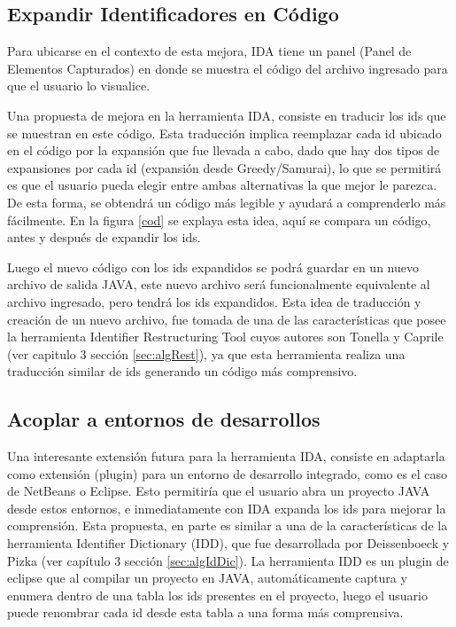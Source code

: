 \subsection{Expandir Identificadores en Código}

Para ubicarse en el contexto de esta mejora, IDA tiene un panel (Panel de Elementos Capturados) en donde se muestra el código del archivo ingresado para que el usuario lo visualice. 


Una propuesta de mejora en la herramienta IDA, consiste en traducir los ids que se muestran en este código.
Esta traducción implica reemplazar cada id ubicado en el código por la expansión que fue llevada a cabo, dado que hay dos tipos de expansiones por cada id (expansión desde Greedy/Samurai), lo que se permitirá es que el usuario pueda elegir entre ambas alternativas la que mejor le parezca. De esta forma, se obtendrá un código más legible y ayudará a comprenderlo más fácilmente. En la figura \ref{cod} se explaya esta idea, aquí se compara un código, antes y después de expandir los ids.

Luego el nuevo código con los ids expandidos se podrá guardar en un nuevo archivo de salida JAVA, este nuevo archivo será funcionalmente equivalente al archivo ingresado, pero tendrá los ids expandidos. Esta idea de traducción y creación de un nuevo archivo, fue tomada de una de las características que posee la herramienta Identifier Restructuring Tool cuyos autores son Tonella y Caprile (ver capitulo 3 sección \ref{sec:algRest}), ya que esta herramienta realiza una traducción similar de ids generando un código más comprensivo.

\subsection{Acoplar a entornos de desarrollos}

Una interesante extensión futura para la herramienta IDA, consiste en adaptarla como extensión (plugin) para un entorno de desarrollo integrado, como es el caso de NetBeans o Eclipse. Esto permitiría que el usuario abra un proyecto JAVA desde estos entornos, e inmediatamente con IDA expanda los ids para mejorar la comprensión. Esta propuesta, en parte es similar a una de la características de la herramienta Identifier Dictionary (IDD), que fue desarrollada por Deissenboeck y Pizka (ver capítulo 3 sección \ref{sec:algIdDic}). La herramienta IDD es un plugin de eclipse que al compilar un proyecto en JAVA, automáticamente captura y enumera dentro de una tabla los ids presentes en el proyecto, luego el usuario puede renombrar cada id desde esta tabla a una forma más comprensiva.

